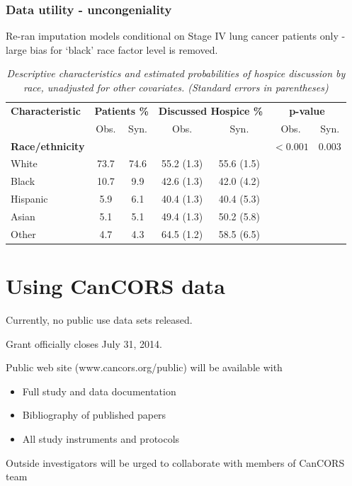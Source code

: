 \documentclass[11pt,handout]{beamer}
\begin{document}
\begin{frame}
\frametitle{Data utility - uncongeniality}

Re-ran imputation models conditional on Stage IV lung cancer patients only - large bias for `black' race factor level is removed.  

\small
\begin{table}
\begin{center}
\caption{\emph{Descriptive characteristics and estimated probabilities of hospice discussion by race, unadjusted for other covariates.   (Standard errors in parentheses)}}
\begin{tabular}{ lcccccc} \hline 
 \textbf{Characteristic} & \multicolumn{2}{c}{\textbf{Patients \%}}  & \multicolumn{2}{c}{\textbf{Discussed Hospice \%}}  &  \multicolumn{2}{c}{\textbf{p-value}}\\ 
& Obs. & Syn. &  Obs. & Syn. & Obs. & Syn.  \\ \hline
\textbf{Race/ethnicity} & & &  & &  $<0.001$  &  0.003 \\
     White & 73.7 & 74.6 & 55.2 (1.3) & 55.6 (1.5) & & \\
       Black & 10.7 & 9.9 & 42.6 (1.3) & 42.0 (4.2) & & \\
      Hispanic & 5.9 & 6.1 & 40.4 (1.3)  & 40.4 (5.3) & &\\
 Asian & 5.1 & 5.1 & 49.4 (1.3)  & 50.2 (5.8) & &  \\
   Other & 4.7 & 4.3  & 64.5 (1.2) & 58.5 (6.5) & & \\ \hline 
\end{tabular}
\label{haiden_biv_race2}
\end{center}
\end{table}

\end{frame}

\section{Using CanCORS data}

\begin{frame}

Currently, no public use data sets released.

Grant officially closes July 31, 2014.

Public web site (www.cancors.org/public) will be available with

\begin{itemize}

  \item Full study and data documentation
  
  \item Bibliography of published papers
  
  \item All study instruments and protocols

\end{itemize}

Outside investigators will be urged to collaborate with members of 
CanCORS team


\end{frame}
\end{document}
